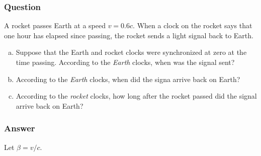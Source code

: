 \subsubsection{Question}

A rocket passes Earth at a speed $v = 0.6c$. When a clock on the rocket says
that one hour has elapsed since passing, the rocket sends a light signal
back to Earth.
\begin{enumerate}[(a)]
    \item
        Suppose that the Earth and rocket clocks were synchronized at zero
        at the time passing. According to the \emph{Earth} clocks, when was
        the signal sent?
    \item
        According to the \emph{Earth} clocks, when did the signa arrive back
        on Earth?
    \item
        According to the \emph{rocket} clocks, how long after the rocket
        passed did the signal arrive back on Earth?
\end{enumerate}

\subsubsection{Answer}

Let $\beta = v/c$.


